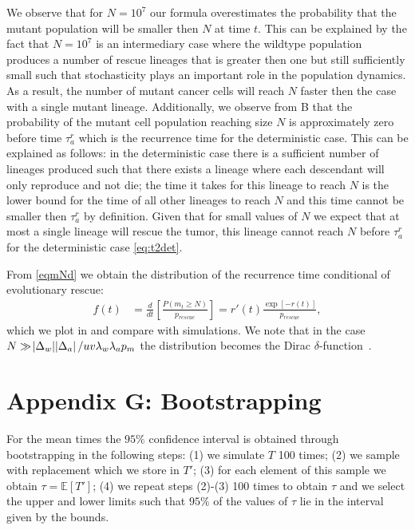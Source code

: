 \documentclass[12pt]{extarticle}
\begin{document}
\begin{appendices}
We observe that for $N=10^7$ our formula overestimates the probability that the mutant population will be smaller then $N$ at time $t$.  This can be explained by the fact that $N=10^7$ is an intermediary case where the wildtype population produces a number of rescue lineages that is greater then one but still sufficiently small such that stochasticity plays an important role in the population dynamics. As a result, the number of mutant cancer cells will reach $N$ faster then the case with a single mutant lineage. Additionally, we observe from B that the probability of the mutant cell population reaching size $N$ is approximately zero before time $\tau_a^r$ which is the recurrence time for the deterministic case. This can be explained as follows: in the deterministic case there is a sufficient number of lineages produced such that there exists a lineage where each descendant will only reproduce and not die; the time it takes for this lineage to reach $N$ is the lower bound for the time of all other lineages to reach $N$ and this time cannot be smaller then $\tau_a^r$ by definition. Given that for small values of $N$ we expect that at most a single lineage will rescue the tumor, this lineage cannot reach $N$ before $\tau_a^r$ for the deterministic case \cref{eq:t2det}.

From  \cref{eqmNd} we obtain the distribution of the recurrence time conditional of evolutionary rescue:
\begin{align}\label{distribution}
f\left(t\right)&=\frac{d}{dt}\left[\frac{P\left(m_t\geq N\right)}{p_{rescue}}\right]=r'\left(t\right)\frac{\exp\left[-r\left(t\right)\right]}{p_{rescue}},
\end{align}
which we plot in  and compare with simulations. We note that in the case $N\gg\abs{\Delta_w}\abs{\Delta_a}/uv\lambda_w\lambda_ap_m$ the distribution becomes the Dirac $\delta$-function~\citep{barton1989elements}.
\section*{Appendix G: Bootstrapping}
For the mean times the $95\%$ confidence interval is obtained through bootstrapping in the following steps: (1) we simulate $T$ 100 times; (2) we sample with replacement which we store in $T'$; (3) for each element of this sample we obtain $\tau=\mathbb{E}\left[T'\right]$; (4) we repeat steps (2)-(3) 100 times to obtain $\tau$ and we select the upper and lower limits such that $95\%$ of the values of $\tau$ lie in the interval given by the bounds.


\end{appendices}
\end{document}
